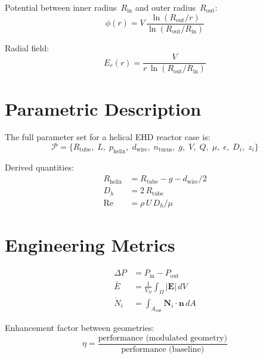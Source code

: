 \documentclass[11pt,a4paper]{article}
\begin{document}
Potential between inner radius~$R_{\mathrm{in}}$ and outer radius~$R_{\mathrm{out}}$:
\begin{equation}
  \phi(r) = V\,\frac{\ln(R_{\mathrm{out}}/r)}{\ln(R_{\mathrm{out}}/R_{\mathrm{in}})}
\end{equation}

Radial field:
\begin{equation}
  E_r(r) = \frac{V}{r\,\ln(R_{\mathrm{out}}/R_{\mathrm{in}})}
\end{equation}

\section{Parametric Description}

The full parameter set for a helical EHD reactor case is:
\begin{equation}
  \mathcal{P} = \bigl\{
    R_{\mathrm{tube}},\;L,\;p_{\mathrm{helix}},\;d_{\mathrm{wire}},\;
    n_{\mathrm{turns}},\;g,\;V,\;Q,\;\mu,\;\epsilon,\;D_i,\;z_i
  \bigr\}
\end{equation}

Derived quantities:
\begin{align}
  R_{\mathrm{helix}} &= R_{\mathrm{tube}} - g - d_{\mathrm{wire}}/2 \\
  D_h &= 2\,R_{\mathrm{tube}} \\
  \mathrm{Re} &= \rho\,U\,D_h / \mu
\end{align}

\section{Engineering Metrics}

\begin{align}
  \Delta P &= P_{\mathrm{in}} - P_{\mathrm{out}} \\
  \bar{E}  &= \frac{1}{V_{\Omega}}\int_{\Omega}|\bm{E}|\,dV \\
  \dot{N}_i &= \int_{A_{\mathrm{out}}}\bm{N}_i\cdot\bm{n}\,dA
\end{align}

Enhancement factor between geometries:
\begin{equation}
  \eta = \frac{\text{performance (modulated geometry)}}
              {\text{performance (baseline)}}
\end{equation}
\end{document}
